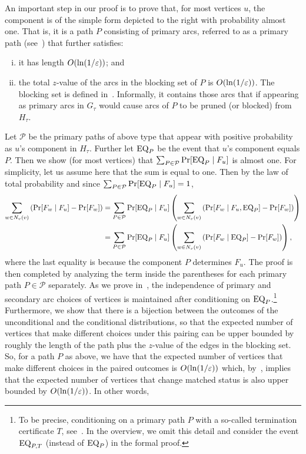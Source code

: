 An important step in our proof is to prove that, for most vertices $u$, the component is of the simple form depicted to the right  with probability almost one. That is, it is a path $P$ consisting of primary arcs, referred to as a primary path (see~) that further satisfies:
\begin{enumerate}[(i)]
  \item it has length $O(\ln(1/\varepsilon))$; and
  \item the total $z$-value of the arcs in the blocking set of $P$ is $O(\ln(1/\varepsilon))$. The blocking set is defined in~. Informally, it contains those arcs that if appearing as primary arcs in $G_\tau$ would cause  arcs of $P$ to be pruned  (or blocked) from $H_\tau$. 
\end{enumerate}
Let $\mathcal{P}$ be the primary paths of above type that appear with positive probability as $u$'s component in $H_\tau$. Further let $\mathrm{EQ}_{P}$ be the event that $u$'s component equals $P$. Then we show (for most vertices) that $\sum_{P \in \mathcal{P}} \Pr[\mathrm{EQ}_{P} \mid F_u]$ is almost one. For simplicity, let us assume here that the sum is equal to one. Then by the law of total probability and since $\sum_{P \in \mathcal{P}} \Pr[\mathrm{EQ}_{P} \mid F_u] =1$, 
\begin{align*}
  \sum_{w \in N_v(v)}\left(\Pr[F_w \mid F_u] - \Pr[F_w]\right) & = \sum_{P\in \mathcal{P}} \Pr[\mathrm{EQ}_{P} \mid F_u]\left( \sum_{w \in N_v(v)}\left(\Pr[F_w \mid F_u, \mathrm{EQ}_{P}] - \Pr[F_w]\right) \right) \\
  & = \sum_{P\in \mathcal{P}} \Pr[\mathrm{EQ}_{P} \mid F_u]\left( \sum_{w \in N_v(v)}\left(\Pr[F_w \mid \mathrm{EQ}_{P}] - \Pr[F_w]\right) \right),
\end{align*}
where the last equality is because the component $P$ determines $F_u$. The proof is then completed by analyzing the term inside the parentheses for each  primary path $P\in \mathcal{P}$ separately. 
As we prove in~, the independence of primary and secondary arc choices of vertices is maintained after conditioning on $\mathrm{EQ}_{P}$.\footnote{To be precise, conditioning on a primary path $P$ with a so-called termination certificate $T$, see~. In the overview, we omit this detail and consider the event $\mathrm{EQ}_{P,T}$ (instead of $\mathrm{EQ}_{P}$) in the formal proof.} Furthermore, we show  that there is a bijection between the outcomes of the  unconditional and the conditional distributions, so that the expected number of vertices that make different choices under this pairing can be upper bounded  by roughly the length of the path plus the $z$-value of the edges in the blocking set. So, for a path $P$ as above, we have that the expected number of vertices that make different choices in the paired outcomes is $O(\ln(1/\varepsilon))$  which, by~, implies that the expected number of vertices that change matched status is also upper bounded by $O(\ln(1/\varepsilon))$.  In other words,
